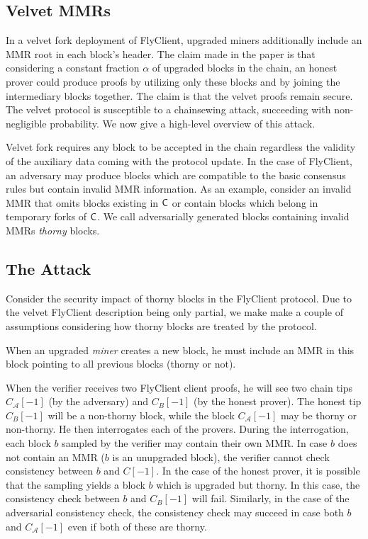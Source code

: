 \subsection{Velvet MMRs}
	In a velvet fork deployment of FlyClient, upgraded miners additionally include an MMR root in each block's header.
    The claim made in the paper is that considering a constant fraction $\alpha$ of upgraded blocks in the chain, an honest prover could produce proofs
    by utilizing only these blocks and by joining the intermediary blocks together.
    The claim is that the velvet proofs remain secure. The velvet protocol is susceptible to a chainsewing attack, succeeding with non-negligible probability.
    We now give a high-level overview of this attack.

	Velvet fork requires any block to be accepted in the chain regardless the validity of the auxiliary data coming with the protocol update.
    In the case of FlyClient, an adversary may produce blocks which are compatible to the basic consensus rules but contain invalid MMR information.
    As an example, consider an invalid MMR that omits blocks existing in $\mathsf{C}$ or contain blocks which belong in temporary forks of $\mathsf{C}$.
    We call adversarially generated blocks containing invalid MMRs \emph{thorny} blocks.

\subsection{The Attack}
	Consider the security impact of thorny blocks in the FlyClient protocol.
	Due to the velvet FlyClient description being only partial, we make
	make a couple of assumptions considering how thorny blocks are treated by the protocol.

	When an upgraded \emph{miner} creates a new block, he must include an MMR in this block
	pointing to all previous blocks (thorny or not).

	When the verifier receives two FlyClient client proofs, he will see two chain tips $C_\mathcal{A}[-1]$ (by the adversary) and $C_B[-1]$
	(by the honest prover). The honest tip $C_B[-1]$ will be a non-thorny block, while the block $C_\mathcal{A}[-1]$ may be thorny or
	non-thorny. He then interrogates each of the provers. During the interrogation, each block $b$ sampled by the verifier may
	contain their own MMR. In case $b$ does not contain an MMR ($b$ is an unupgraded block), the verifier cannot check consistency
	between $b$ and $C[-1]$.
	In the case of the honest prover, it is possible that the sampling yields a block $b$ which is upgraded but thorny.
	In this case, the consistency check between $b$ and $C_B[-1]$ will fail.
	Similarly, in the case of the adversarial consistency check, the consistency check may succeed in case both $b$ and $C_\mathcal{A}[-1]$
	even if both of these are thorny.

